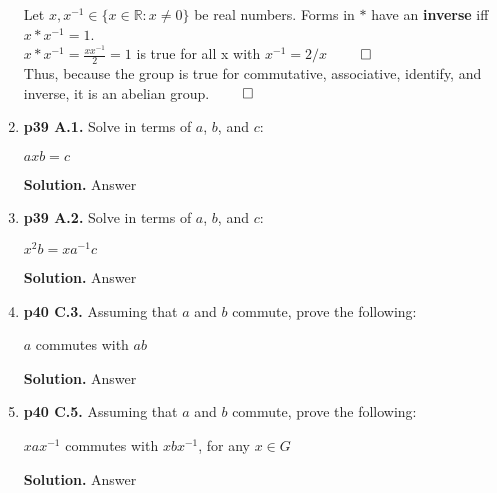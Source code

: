 \documentclass[11pt]{article}
\begin{document}
\begin{enumerate}
  Let $x,x^{-1} \in \{x \in \mathbb{R} : x \neq 0\}$ be real numbers. Forms in $*$ have an {\bfseries inverse} iff $x*x^{-1} = 1$. \\
  $x*x^{-1} = \frac{xx^{-1}}{2} = 1$ is true for all x with $x^{-1} = 2/x$ $\qed$\\
  
  Thus, because the group is true for commutative, associative, identify, and inverse, it is an abelian group. $\qed$\\
 
\item {\bfseries p39 A.1.}
  Solve in terms of $a$, $b$, and $c$:
  
  $axb = c$
  
  {\bfseries Solution.}
  Answer
 
\item {\bfseries p39 A.2.}
  Solve in terms of $a$, $b$, and $c$:
  
  $x^2b = xa^{-1}c$
  
  {\bfseries Solution.}
  Answer
 
\item {\bfseries p40 C.3.}
  Assuming that $a$ and $b$ commute, prove the following:
  
  $a$ commutes with $ab$
  
  {\bfseries Solution.}
  Answer
 
\item {\bfseries p40 C.5.}
  Assuming that $a$ and $b$ commute, prove the following:
  
  $xax^{-1}$ commutes with $xbx^{-1}$, for any $x \in G$
  
  {\bfseries Solution.}
  Answer


\end{enumerate}
\end{document}
